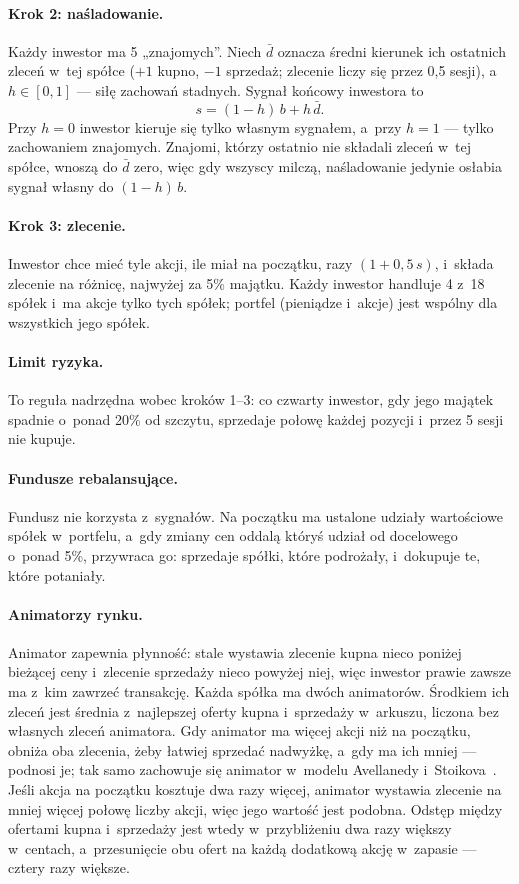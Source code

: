 \documentclass[11pt,a4paper]{article}
\begin{document}
\paragraph{Krok 2: naśladowanie.} Każdy inwestor ma 5 „znajomych”. Niech $\bar d$ oznacza średni kierunek ich
ostatnich zleceń w~tej spółce ($+1$ kupno, $-1$ sprzedaż; zlecenie liczy się przez 0,5 sesji), a~$h \in [0, 1]$ ---
siłę zachowań stadnych. Sygnał końcowy inwestora to
\begin{equation}
  s = (1-h)\, b + h\, \bar d.
\end{equation}
Przy $h = 0$ inwestor kieruje się tylko własnym sygnałem, a~przy $h = 1$ --- tylko zachowaniem znajomych. Znajomi,
którzy ostatnio nie składali zleceń w~tej spółce, wnoszą do $\bar d$ zero, więc gdy wszyscy milczą, naśladowanie
jedynie osłabia sygnał własny do $(1-h)\, b$.

\paragraph{Krok 3: zlecenie.} Inwestor chce mieć tyle akcji, ile miał na początku, razy $(1 + 0{,}5\, s)$, i~składa
zlecenie na różnicę, najwyżej za 5\% majątku. Każdy inwestor handluje 4 z~18 spółek i~ma akcje tylko tych spółek;
portfel (pieniądze i~akcje) jest wspólny dla wszystkich jego spółek.

\paragraph{Limit ryzyka.} To reguła nadrzędna wobec kroków 1--3: co czwarty inwestor, gdy jego majątek spadnie
o~ponad 20\% od szczytu, sprzedaje połowę każdej pozycji i~przez 5 sesji nie kupuje.

\paragraph{Fundusze rebalansujące.} Fundusz nie korzysta z~sygnałów. Na początku ma ustalone udziały wartościowe
spółek w~portfelu, a~gdy zmiany cen oddalą któryś udział od docelowego o~ponad 5\%, przywraca go: sprzedaje spółki,
które podrożały, i~dokupuje te, które potaniały.

\paragraph{Animatorzy rynku.} Animator zapewnia płynność: stale wystawia zlecenie kupna nieco poniżej bieżącej ceny
i~zlecenie sprzedaży nieco powyżej niej, więc inwestor prawie zawsze ma z~kim zawrzeć transakcję. Każda spółka ma
dwóch animatorów. Środkiem ich zleceń jest średnia z~najlepszej oferty kupna i~sprzedaży w~arkuszu, liczona bez
własnych zleceń animatora. Gdy animator ma więcej akcji niż na początku, obniża oba zlecenia, żeby łatwiej sprzedać
nadwyżkę, a~gdy ma ich mniej --- podnosi je; tak samo zachowuje się animator w~modelu Avellanedy
i~Stoikova~\cite{avellaneda2008}. Jeśli akcja na początku kosztuje dwa razy więcej, animator wystawia zlecenie
na mniej więcej połowę liczby akcji, więc jego wartość jest podobna. Odstęp między ofertami kupna i~sprzedaży
jest wtedy w~przybliżeniu dwa razy większy w~centach, a~przesunięcie obu ofert na każdą dodatkową akcję
w~zapasie --- cztery razy większe.
\end{document}
